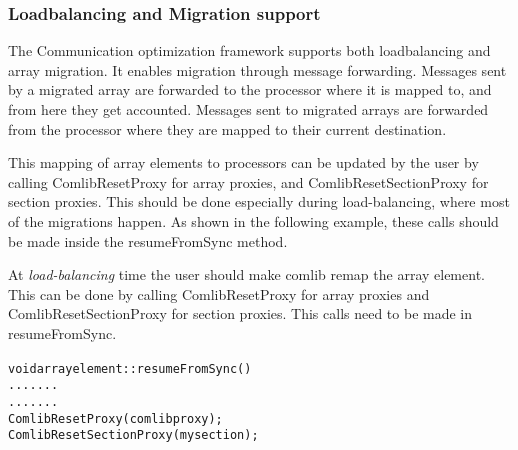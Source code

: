 



\subsubsection{Loadbalancing and Migration support}

The Communication optimization framework supports both loadbalancing and array
migration. It enables migration through message forwarding. Messages sent by a
migrated array are forwarded to the processor where it is mapped to, and from
here they get accounted. Messages sent to migrated arrays are forwarded from the
processor where they are mapped to their current destination.

This mapping of array elements to processors can be updated by the user by
calling {\textrm{ComlibResetProxy}} for array proxies, and
{\textrm{ComlibResetSectionProxy}} for section proxies. This should be done
especially during load-balancing, where most of the migrations happen. As shown
in the following example, these calls should be made inside the
{\textrm{resumeFromSync}} method.

At {\em load-balancing} time the user should make comlib remap the array
element. This can be done by calling ComlibResetProxy for array proxies and
ComlibResetSectionProxy for section proxies. This calls need to be made in
resumeFromSync.

\begin{alltt}
  void arrayelement::resumeFromSync() {
      .......
      .......
      ComlibResetProxy(comlibproxy);
      ComlibResetSectionProxy(mysection);
  }
\end{alltt}

